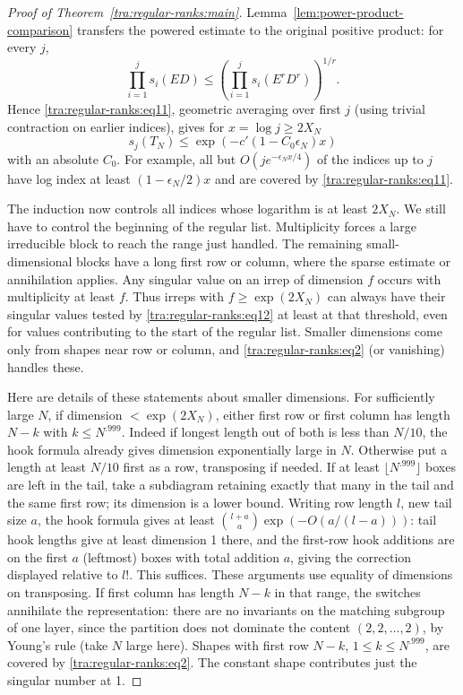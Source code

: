 \begin{proof}[Proof of Theorem~\ref{tra:regular-ranks:main}]
Lemma~\ref{lem:power-product-comparison} transfers the powered
estimate to the original positive product: for every $j$,
\[
 \prod_{i=1}^j s_i(ED)
 \le\left(\prod_{i=1}^j s_i(E^rD^r)\right)^{1/r}.
\]
Hence \eqref{tra:regular-ranks:eq11}, geometric averaging over first \(j\) (using trivial contraction on earlier indices), gives for \(x=\log j\ge2X_N\)
\begin{equation}
                          s_j(T_N)
                              \le \exp(-c'(1-C_0\epsilon_N)x)\label{tra:regular-ranks:eq12}
\end{equation}
with an absolute \(C_0\). For example, all but \(O(j e^{-\epsilon_N x/4})\) of the indices up to \(j\) have log index at least \((1-\epsilon_N/2)x\) and are covered by \eqref{tra:regular-ranks:eq11}.

The induction now controls all indices whose logarithm is at least
$2X_N$. We still have to control the beginning of the regular list.
Multiplicity forces a large irreducible block to reach the range just
handled. The remaining small-dimensional blocks have a long first row
or column, where the sparse estimate or annihilation applies. Any singular value on an irrep of dimension \(f\) occurs with multiplicity at least \(f\). Thus irreps with \(f\ge\exp(2X_N)\) can always have their singular values tested by \eqref{tra:regular-ranks:eq12} at least at that threshold, even for values contributing to the start of the regular list. Smaller dimensions come only from shapes near row or column, and \eqref{tra:regular-ranks:eq2} (or vanishing) handles these.

Here are details of these statements about smaller dimensions. For sufficiently large \(N\), if dimension \(<\exp(2X_N)\), either first row or first column has length \(N-k\) with \(k\le N^{.999}\). Indeed if longest length out of both is less than \(N/10\), the hook formula already gives dimension exponentially large in \(N\). Otherwise put a length at least \(N/10\) first as a row, transposing if needed. If at least \(\lfloor N^{.999}\rfloor\) boxes are left in the tail, take a subdiagram retaining exactly that many in the tail and the same first row; its dimension is a lower bound. Writing row length \(l\), new tail size \(a\), the hook formula gives at least
\(\binom{l+a}{a}\exp(-O(a/(l-a)))\): tail hook lengths give at least dimension 1 there, and the first-row hook additions are on the first \(a\) (leftmost) boxes with total addition \(a\), giving the correction displayed relative to \(l!\). This suffices. These arguments use equality of dimensions on transposing. If first column has length \(N-k\) in that range, the switches annihilate the representation: there are no invariants on the matching subgroup of one layer, since the partition does not dominate the content \((2,2,\ldots,2)\), by Young's rule (take \(N\) large here). Shapes with first row \(N-k\), \(1\le k\le N^{.999}\), are covered by \eqref{tra:regular-ranks:eq2}. The constant shape contributes just the singular number at 1.


\end{proof}
